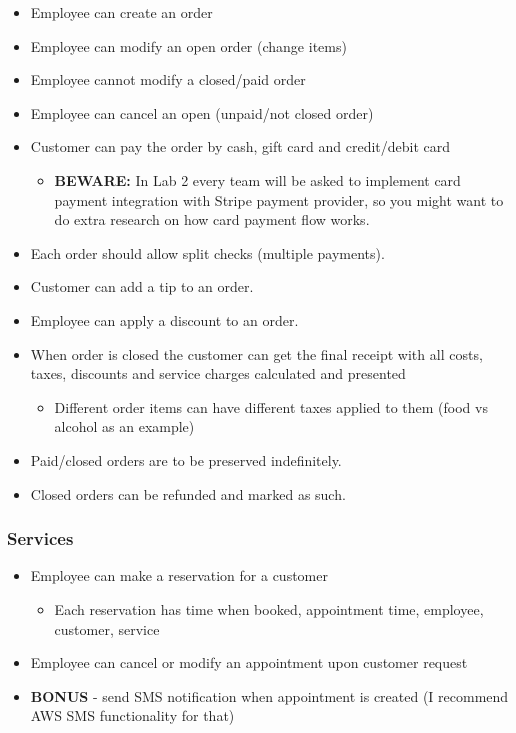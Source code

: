 \documentclass[]{VUMIFTemplateClass}
\begin{document}
\begin{itemize}
    \item Employee can create an order
    \item Employee can modify an open order (change items)
    \item Employee cannot modify a closed/paid order
    \item Employee can cancel an open (unpaid/not closed order)
    \item Customer can pay the order by cash, gift card and credit/debit card
    \begin{itemize}
        \item \textbf{BEWARE:} In Lab 2 every team will be asked to implement card payment integration with Stripe payment provider, so you might want to do extra research on how card payment flow works.
    \end{itemize}
    \item Each order should allow split checks (multiple payments).
    \item Customer can add a tip to an order.
    \item Employee can apply a discount to an order.
    \item When order is closed the customer can get the final receipt with all costs, taxes, discounts and service charges calculated and presented
    \begin{itemize}
        \item Different order items can have different taxes applied to them (food vs alcohol as an example)
    \end{itemize}
    \item Paid/closed orders are to be preserved indefinitely.
    \item Closed orders can be refunded and marked as such.
\end{itemize}

\subsubsection*{Services}

\begin{itemize}
    \item Employee can make a reservation for a customer
    \begin{itemize}
        \item Each reservation has time when booked, appointment time, employee, customer, service
    \end{itemize}
    \item Employee can cancel or modify an appointment upon customer request
    \item \textbf{BONUS} - send SMS notification when appointment is created (I recommend AWS SMS functionality for that)
\end{itemize}
\end{document}
